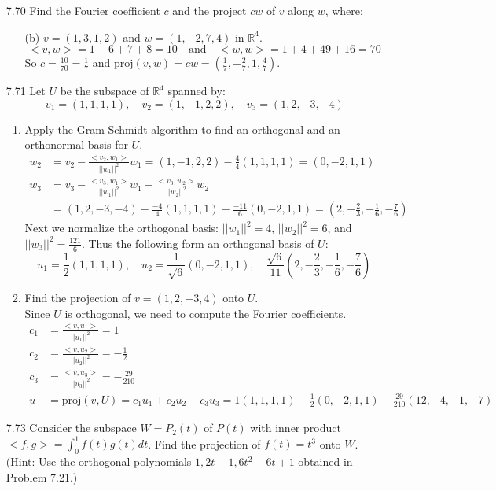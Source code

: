\documentclass[12pt]{article}
\theoremstyle{definition}
\theoremstyle{plain}
\begin{document}
\begin{enumerate}
\item[7.70]Find the Fourier coefficient $c$ and the project $cw$ of $v$ along $w$, where:
	\begin{enumerate}
	\item[(b)] $v=(1,3,1,2)$ and $w=(1,-2,7,4)$ in $\mathbb{R}^4$.
		\[ <v,w>=1-6+7+8=10 \quad \mathrm{and} \quad <w,w>=1+4+49+16=70 \]
		So $c=\frac{10}{70}=\frac{1}{7}$ and $\mathrm{proj}(v,w)=cw=(\frac{1}{7},-\frac{2}{7},1,\frac{4}{7})$.
	\end{enumerate}

\item[7.71]Let $U$ be the subspace of $\mathbb{R}^4$ spanned by:
\[ v_1=(1,1,1,1), \quad v_2=(1,-1,2,2), \quad v_3=(1,2,-3,-4) \]
	\begin{enumerate}
	\item Apply the Gram-Schmidt algorithm to find an orthogonal and an orthonormal basis for $U$.
		\begin{align*}
		w_2&=v_2-\frac{<v_2,w_1>}{||w_1||^2}w_1 = (1,-1,2,2)-\frac{4}{4}(1,1,1,1) = (0,-2,1,1)\\
		w_3&=v_3-\frac{<v_3,w_1>}{||w_1||^2}w_1-\frac{<v_3,w_2>}{||w_2||^2}w_2\\
		&= (1,2,-3,-4)-\frac{-4}{4}(1,1,1,1)-\frac{-11}{6}(0,-2,1,1) = (2,-\frac{2}{3},-\frac{1}{6},-\frac{7}{6})
		\end{align*}
		Next we normalize the orthogonal basis: $||w_1||^2 = 4$, $||w_2||^2=6$, and $||w_3||^2=\frac{121}{6}$. Thus the following form an orthogonal basis of $U$:
		\[ u_1=\frac{1}{2}(1,1,1,1), \quad u_2=\frac{1}{\sqrt{6}}(0,-2,1,1), \quad \frac{\sqrt{6}}{11}(2,-\frac{2}{3},-\frac{1}{6},-\frac{7}{6}) \]
	\item Find the projection of $v=(1,2,-3,4)$ onto $U$.\\
	Since $U$ is orthogonal, we need to compute the Fourier coefficients.
	\begin{align*}
	c_1 &= \frac{<v,u_1>}{||u_1||^2} = 1\\
	c_2 &= \frac{<v,u_2>}{||u_2||^2} = -\frac{1}{2}\\
	c_3 &= \frac{<v,u_3>}{||u_3||^2} = -\frac{29}{210}\\
	u&=\mathrm{proj}(v,U)=c_1u_1+c_2u_2+c_3u_3 = 1(1,1,1,1)-\frac{1}{2}(0,-2,1,1)-\frac{29}{210}(12,-4,-1,-7)
	\end{align*}
	\end{enumerate}

\item[7.73]Consider the subspace $W=P_2(t)$ of $P(t)$ with inner product $<f,g>=\int_0^1f(t)g(t)dt$. Find the projection of $f(t)=t^3$ onto $W$. (Hint: Use the orthogonal polynomials $1,2t-1,6t^2-6t+1$ obtained in Problem 7.21.)


\end{enumerate}
\end{document}
